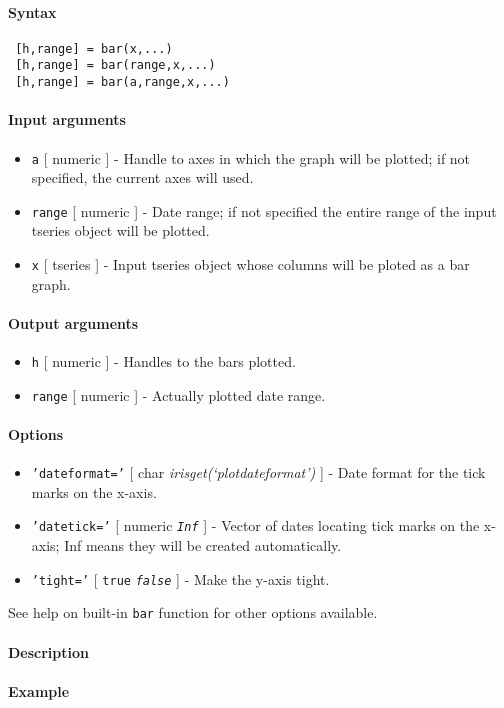 


	\paragraph{Syntax}
 
 \begin{verbatim}
 [h,range] = bar(x,...)
 [h,range] = bar(range,x,...)
 [h,range] = bar(a,range,x,...)
 \end{verbatim}
 
 \paragraph{Input arguments}
 
 \begin{itemize}
 \item
   \texttt{a} {[} numeric {]} - Handle to axes in which the graph will be
   plotted; if not specified, the current axes will used.
 \item
   \texttt{range} {[} numeric {]} - Date range; if not specified the
   entire range of the input tseries object will be plotted.
 \item
   \texttt{x} {[} tseries {]} - Input tseries object whose columns will
   be ploted as a bar graph.
 \end{itemize}
 
 \paragraph{Output arguments}
 
 \begin{itemize}
 \item
   \texttt{h} {[} numeric {]} - Handles to the bars plotted.
 \item
   \texttt{range} {[} numeric {]} - Actually plotted date range.
 \end{itemize}
 
 \paragraph{Options}
 
 \begin{itemize}
 \item
   \texttt{'dateformat='} {[} char \textbar{}
   \emph{irisget(`plotdateformat')} {]} - Date format for the tick marks
   on the x-axis.
 \item
   \texttt{'datetick='} {[} numeric \textbar{} \emph{\texttt{Inf}} {]} -
   Vector of dates locating tick marks on the x-axis; Inf means they will
   be created automatically.
 \item
   \texttt{'tight='} {[} \texttt{true} \textbar{} \emph{\texttt{false}}
   {]} - Make the y-axis tight.
 \end{itemize}
 
 See help on built-in \texttt{bar} function for other options available.
 
 \paragraph{Description}
 
 \paragraph{Example}



